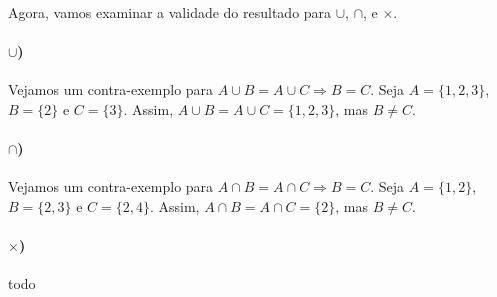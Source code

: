 \documentclass[11pt,a4paper]{report}
\begin{document}
    \paragraph{}
    Agora, vamos examinar a validade do resultado para $\cup$, $\cap$, e $\times$.

    \paragraph{$\cup$)}
    Vejamos um contra-exemplo para $A \cup B = A \cup C \Rightarrow B = C$. Seja $A = \{1, 2, 3\}$, $B = \{2\}$ e $C = \{3\}$. Assim, $A \cup B = A \cup C = \{1, 2, 3\}$, mas $B \not= C$.

    \paragraph{$\cap$)}
    Vejamos um contra-exemplo para $A \cap B = A \cap C \Rightarrow B = C$. Seja $A = \{1, 2\}$, $B = \{2, 3\}$ e $C = \{2, 4\}$. Assim, $A \cap B = A \cap C = \{2\}$, mas $B \not= C$.

    \paragraph{$\times$)}
    todo
\end{document}
